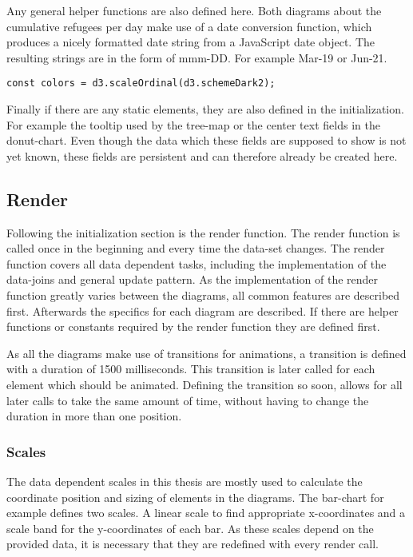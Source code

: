 Any general helper functions are also defined here. Both diagrams about the cumulative refugees per day make use of a date conversion function, which produces a nicely formatted date string from a JavaScript date object. The resulting strings are in the form of mmm-DD. For example Mar-19 or Jun-21.

\begin{minipage}{0.9\linewidth}
    \begin{lstlisting}[style=htmlcssjs, captionpos=b, caption={Definition of the data independent color scale. \texttt{d3.schemeDarkv2} is a predefined list of color values which is to be used by the scale.}, label={color_scale}]
const colors = d3.scaleOrdinal(d3.schemeDark2);
    \end{lstlisting}
\end{minipage}

Finally if there are any static elements, they are also defined in the initialization. For example the tooltip used by the tree-map or the center text fields in the donut-chart. Even though the data which these fields are supposed to show is not yet known, these fields are persistent and can therefore already be created here.

\subsection{Render}
Following the initialization section is the render function. The render function is called once in the beginning and every time the data-set changes. The render function covers all data dependent tasks, including the implementation of the data-joins and general update pattern. As the implementation of the render function greatly varies between the diagrams, all common features are described first. Afterwards the specifics for each diagram are described. If there are helper functions or constants required by the render function they are defined first. 

As all the diagrams make use of transitions for animations, a transition is defined with a duration of 1500 milliseconds. This transition is later called for each element which should be animated. Defining the transition so soon, allows for all later calls to take the same amount of time, without having to change the duration in more than one position.

\subsubsection{Scales}
The data dependent scales in this thesis are mostly used to calculate the coordinate position and sizing of elements in the diagrams. The bar-chart for example defines two scales. A linear scale to find appropriate x-coordinates and a scale band for the y-coordinates of each bar. As these scales depend on the provided data, it is necessary that they are redefined with every render call.

